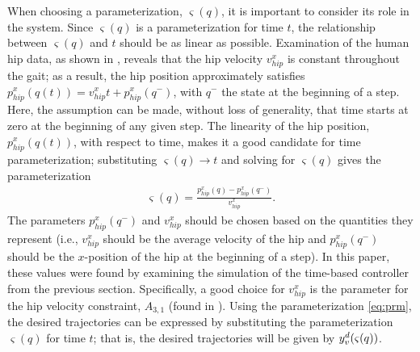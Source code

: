 When choosing a parameterization, $\varsigma(q)$, it is important to consider its role in the system. Since $\varsigma(q)$ is a parameterization for time $t$, the relationship between $\varsigma(q)$ and $t$ should be as linear as possible. Examination of the human hip data, as shown in , reveals that the hip velocity $v_{\mathit{hip}}^{x}$ is constant throughout the gait; as a result, the hip position approximately satisfies $p_{\mathit{hip}}^{x}(q(t)) = v_{\mathit{hip}}^x t + p_\mathit{hip}^x(q^-)$, with $q^-$ the state at the beginning of a step. Here, the assumption can be made, without loss of generality, that time starts at zero at the beginning of any given step. The linearity of the hip position, $p_{\mathit{hip}}^{x}(q(t))$, with respect to time, makes it a good candidate for time parameterization; substituting $\varsigma(q) \to t$ and solving for $\varsigma(q)$ gives the parameterization
\begin{align}
  \label{eq:prm}
  \varsigma(q) = \frac{p_{\mathit{hip}}^{x}(q) - p_{\mathit{hip}}^{x}(q^-)}{v_{\mathit{hip}}^{x}}.
\end{align}
The parameters $p_{\mathit{hip}}^{x}(q^-)$ and $v_{\mathit{hip}}^{x}$ should be chosen based on the quantities they represent (i.e., $v_{\mathit{hip}}^{x}$ should be the average velocity of the hip and $p_{\mathit{hip}}^{x}(q^-)$ should be the $x$-position of the hip at the beginning of a step). In this paper, these values were found by examining the simulation of the time-based controller from the previous section. Specifically, a good choice for $v_{\mathit{hip}}^{x}$ is the parameter for the hip velocity constraint, $A_{3,1}$ (found in ). Using the parameterization \eqref{eq:prm}, the desired trajectories can be expressed by substituting the parameterization $\varsigma(q)$ for time $t$; that is, the desired trajectories will be given by $y_{v}^{d}(\varsigma(q))$.

